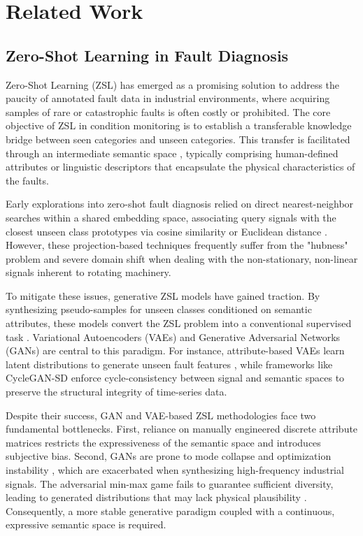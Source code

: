 \section{Related Work}

\subsection{Zero-Shot Learning in Fault Diagnosis}

Zero-Shot Learning (ZSL) has emerged as a promising solution to address the paucity of annotated fault data in industrial environments, where acquiring samples of rare or catastrophic faults is often costly or prohibited. The core objective of ZSL in condition monitoring is to establish a transferable knowledge bridge between seen categories and unseen categories. This transfer is facilitated through an intermediate semantic space \cite{mikolov2013efficient}, typically comprising human-defined attributes or linguistic descriptors that encapsulate the physical characteristics of the faults.

Early explorations into zero-shot fault diagnosis relied on direct nearest-neighbor searches within a shared embedding space, associating query signals with the closest unseen class prototypes via cosine similarity or Euclidean distance \cite{tzeng2017adversarial}. However, these projection-based techniques frequently suffer from the "hubness" problem \cite{xian2019zero} and severe domain shift \cite{tzeng2017adversarial} when dealing with the non-stationary, non-linear signals inherent to rotating machinery.

To mitigate these issues, generative ZSL models \cite{xian2018feature} have gained traction. By synthesizing pseudo-samples for unseen classes conditioned on semantic attributes, these models convert the ZSL problem into a conventional supervised task \cite{liao2024cyclegan}. Variational Autoencoders (VAEs) \cite{lv2020hybrid} and Generative Adversarial Networks (GANs) are central to this paradigm. For instance, attribute-based VAEs learn latent distributions to generate unseen fault features \cite{wang2020deep}, while frameworks like CycleGAN-SD \cite{liao2024cyclegan,zhu2017unpaired} enforce cycle-consistency between signal and semantic \cite{radford2021learning} spaces to preserve the structural integrity of time-series data.

Despite their success, GAN and VAE-based ZSL methodologies face two fundamental bottlenecks. First, reliance on manually engineered discrete attribute matrices restricts the expressiveness of the semantic space and introduces subjective bias. Second, GANs are prone to mode collapse and optimization instability \cite{arjovsky2017wasserstein}, which are exacerbated when synthesizing high-frequency industrial signals. The adversarial min-max game fails to guarantee sufficient diversity, leading to generated distributions that may lack physical plausibility \cite{goodfellow2014generative}. Consequently, a more stable generative paradigm coupled with a continuous, expressive semantic space is required.

